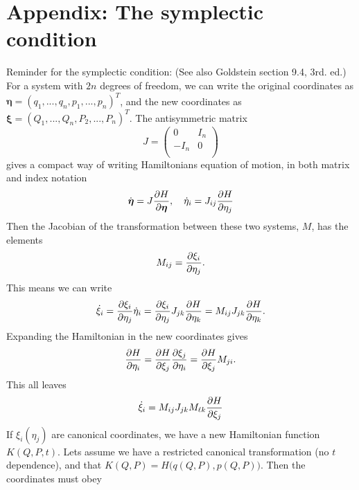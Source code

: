 \documentclass{article}
\begin{document}
    \section*{Appendix: The symplectic condition}
        Reminder for the symplectic condition: (See also Goldstein section 9.4, 3rd. ed.) For a system with $2n$ degrees of freedom, we can write the original coordinates as $\boldsymbol{\eta} = (q_1, ..., q_n, p_1, ..., p_n)^T$, and the new coordinates as $\boldsymbol{\xi} = (Q_1, ..., Q_n, P_2, ..., P_n)^T$. 
        The antisymmetric matrix
        \begin{equation*}
            J = \begin{pmatrix*}
                0 & I_n \\
                -I_n & 0 \\
            \end{pmatrix*}
        \end{equation*}
        gives a compact way of writing Hamiltonians equation of motion, in both matrix and index notation
        \begin{equation*}
            \dot{\boldsymbol{\eta}} = J \pdv{H}{\boldsymbol{\eta}}, \quad
            \dot \eta_i = J_{ij} \pdv{H}{\eta_j}
        \end{equation*}
        Then the Jacobian of the transformation between these two systems, $M$, has the elements
        \begin{equation*}
            M_{ij} = \pdv{\xi_i}{\eta_j}.
        \end{equation*}
        This means we can write 
        \begin{equation*}
            \dot \xi_i = \pdv{\xi_i}{\eta_j} \dot \eta_i = \pdv{\xi_i}{\eta_j} J_{jk} \pdv{H}{\eta_k} = M_{ij} J_{jk} \pdv{H}{\eta_k}.
        \end{equation*}
        Expanding the Hamiltonian in the new coordinates gives
        \begin{equation*}
            \pdv{H}{\eta_i} = \pdv{H}{\xi_j} \pdv{\xi_j}{\eta_i} = \pdv{H}{\xi_j} M_{ji}.
        \end{equation*}
        This all leaves
        \begin{equation*}
            \dot \xi_i = M_{ij} J_{jk} M_{\ell k} \pdv{H}{\xi_j}
        \end{equation*}
        If $\xi_i(\eta_j)$ are canonical coordinates, we have a new Hamiltonian function $K(Q, P, t)$. Lets assume we have a restricted canonical transformation (no $t$ dependence), and that $K(Q, P) = H\Big(q(Q, P), p(Q, P)\Big)$. Then the coordinates must obey
\end{document}

